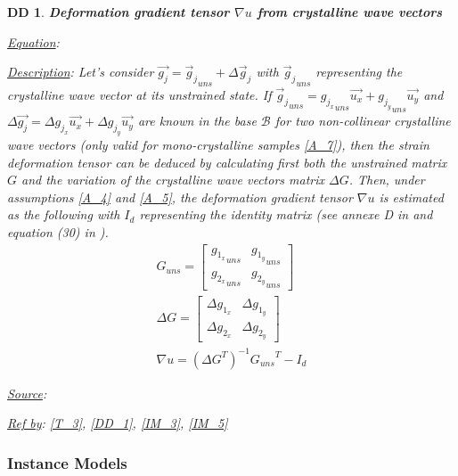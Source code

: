 \documentclass[12pt]{article}
\newtheorem{DD}{DD}
\begin{document}
\begin{DD}
\label{DD_3}
\noindent\colorbox{shadecolorDD}{\normalfont \textbf{Deformation gradient tensor $\nabla u$ from crystalline wave vectors}}
\normalfont
\item \underline{Equation}: 
\item \underline{Description}: Let's consider $\overrightarrow{g_j} = {\overrightarrow{g}_{j}}_{uns} + \Delta \overrightarrow{g}_j$ with ${\overrightarrow{g}_{j}}_{uns}$ representing the crystalline wave vector at its unstrained state. If ${\overrightarrow{g}_{j}}_{uns}={g_{j_{x}}}_{uns}\overrightarrow{u_{x}}+{g_{j_{y}}}_{uns}\overrightarrow{u_{y}}$ and $\Delta \overrightarrow{g_{j}}=\Delta g_{j_{x}}\overrightarrow{u_{x}}+\Delta g_{j_{y}}\overrightarrow{u_{y}}$ are known in the base $\mathcal{B}$ for two non-collinear crystalline wave vectors (only valid for mono-crystalline samples \cref{A_7}), then the strain deformation tensor can be deduced by calculating first both the unstrained matrix $G$ and the variation of the crystalline wave vectors matrix $\Delta G$. Then, under assumptions \cref{A_4} and \cref{A_5}, the deformation gradient tensor $\nabla u$ is estimated as the following with $I_{d}$ representing the identity matrix (see annexe D in \cite{Hytch1998} and equation (30) in \cite{Rouviere2005}). 
\begin{equation}
\begin{gathered}
	G_{uns} =
	\begin{bmatrix}
	{g_{1_{x}}}_{uns} & {g_{1_{y}}}_{uns} \\
	{g_{2_{x}}}_{uns} & {g_{2_{y}}}_{uns} 
	\end{bmatrix} \\
	\Delta G =
	\begin{bmatrix}
	\Delta g_{1_{x}} & \Delta g_{1_{y}} \\
	\Delta g_{2_{x}} & \Delta g_{2_{y}} 
	\end{bmatrix} \\
\nabla u = ({\Delta G}^{T})^{-1}{G_{uns}}^{T}-I_{d}
\end{gathered}
\label{eq:strain_1}
\end{equation}
\item \underline{Source}: \cite{Hytch1998,Rouviere2005}
\item \underline{Ref by}: \cref{T_3}, \cref{DD_1}, \cref{IM_3}, \cref{IM_5}
\end{DD}

\subsubsection{Instance Models} \label{sec_instance}    
\end{document}
